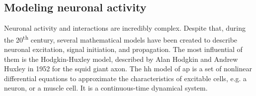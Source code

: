 \documentclass[class={myRUCProject}, crop=false]{standalone}
\begin{document}



 


\subsection*{Modeling neuronal activity}


Neuronal activity and interactions are incredibly complex. Despite that, during the 20\textsuperscript{th} century, several mathematical models have been created to describe neuronal excitation, signal initiation, and propagation. 
The most influential of them is the Hodgkin-Huxley model, described by Alan Hodgkin and Andrew Huxley in 1952 for the squid giant axon. 
The \gls{hh} model of \gls{ap} is a set of nonlinear differential equations to approximate the characteristics of excitable cells, e.g. a neuron, or a muscle cell. It is a continuous-time dynamical system.  
\end{document}
